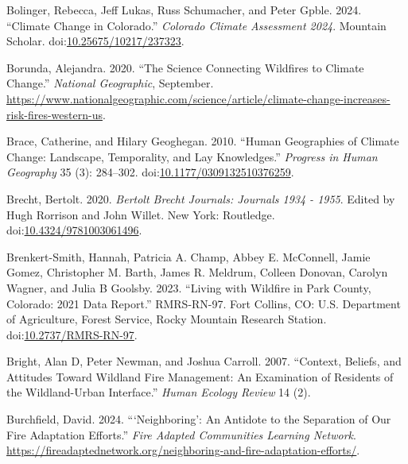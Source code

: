\documentclass[
]{article}
\newlength{\cslhangindent}
\newenvironment{CSLReferences}[2] %
 {\begin{list}{}{%
  \setlength{\itemindent}{0pt}
  \setlength{\leftmargin}{0pt}
  \setlength{\parsep}{0pt}
  \ifodd #1
   \setlength{\leftmargin}{\cslhangindent}
   \setlength{\itemindent}{-1\cslhangindent}
  \fi
  \setlength{\itemsep}{#2\baselineskip}}}
 {\end{list}}
\begin{document}
\begin{CSLReferences}{1}{0}
Bolinger, Rebecca, Jeff Lukas, Russ Schumacher, and Peter Gpble. 2024. {``Climate {Change} in {Colorado}.''} \emph{Colorado Climate Assessment 2024}. Mountain Scholar. doi:\href{https://doi.org/10.25675/10217/237323}{10.25675/10217/237323}.

Borunda, Alejandra. 2020. {``The Science Connecting Wildfires to Climate Change.''} \emph{National Geographic}, September. \url{https://www.nationalgeographic.com/science/article/climate-change-increases-risk-fires-western-us}.

Brace, Catherine, and Hilary Geoghegan. 2010. {``Human Geographies of Climate Change: {Landscape}, Temporality, and Lay Knowledges.''} \emph{Progress in Human Geography} 35 (3): 284--302. doi:\href{https://doi.org/10.1177/0309132510376259}{10.1177/0309132510376259}.

Brecht, Bertolt. 2020. \emph{Bertolt {Brecht Journals}: {Journals} 1934 - 1955}. Edited by Hugh Rorrison and John Willet. New York: Routledge. doi:\href{https://doi.org/10.4324/9781003061496}{10.4324/9781003061496}.

Brenkert-Smith, Hannah, Patricia A. Champ, Abbey E. McConnell, Jamie Gomez, Christopher M. Barth, James R. Meldrum, Colleen Donovan, Carolyn Wagner, and Julia B Goolsby. 2023. {``Living with Wildfire in {Park County}, {Colorado}: 2021 {Data Report}.''} RMRS-RN-97. Fort Collins, CO: U.S. Department of Agriculture, Forest Service, Rocky Mountain Research Station. doi:\href{https://doi.org/10.2737/RMRS-RN-97}{10.2737/RMRS-RN-97}.

Bright, Alan D, Peter Newman, and Joshua Carroll. 2007. {``Context, {Beliefs}, and {Attitudes} Toward {Wildland Fire Management}: {An Examination} of {Residents} of the {Wildland-Urban Interface}.''} \emph{Human Ecology Review} 14 (2).

Burchfield, David. 2024. {``{`{Neighboring}'}: {An Antidote} to the {Separation} of {Our Fire Adaptation Efforts}.''} \emph{Fire Adapted Communities Learning Network}. \url{https://fireadaptednetwork.org/neighboring-and-fire-adaptation-efforts/}.


\end{CSLReferences}
\end{document}
